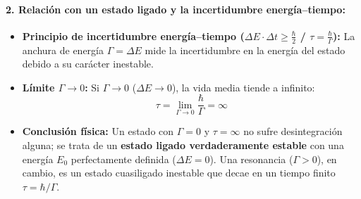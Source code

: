 \begin{problema}
\paragraph{2. Relación con un estado ligado y la incertidumbre energía--tiempo:}
\begin{itemize}
    \item \textbf{Principio de incertidumbre energía--tiempo ($\Delta E \cdot \Delta t \ge \frac{\hbar}{2}$ / $\tau = \frac{\hbar}{\Gamma}$):} La anchura de energía $\Gamma = \Delta E$ mide la incertidumbre en la energía del estado debido a su carácter inestable.
    \item \textbf{Límite $\Gamma \to 0$:} Si $\Gamma \to 0$ ($\Delta E \to 0$), la vida media tiende a infinito:
    \begin{equation*}
    \tau = \lim_{\Gamma \to 0} \frac{\hbar}{\Gamma} = \infty
    \end{equation*}
    \item \textbf{Conclusión física:} Un estado con $\Gamma = 0$ y $\tau = \infty$ no sufre desintegración alguna; se trata de un \textbf{estado ligado verdaderamente estable} con una energía $E_0$ perfectamente definida ($\Delta E = 0$). Una resonancia ($\Gamma > 0$), en cambio, es un estado cuasiligado inestable que decae en un tiempo finito $\tau = \hbar/\Gamma$.
\end{itemize}
\end{problema}
\newpage
